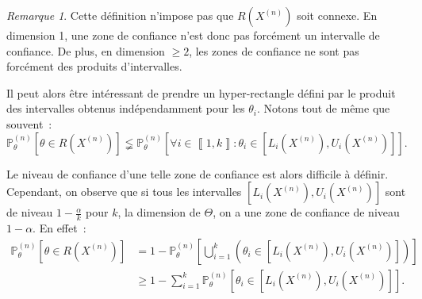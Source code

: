 \documentclass{report}
\renewcommand{\P}{\mathbb P}
\newcommand{\intint}[2]{\left\llbracket#1, #2\right\rrbracket}
\newcommand{\n}{{(n)}}
\newcommand{\Xn}{{X^\n}}
\theoremstyle{definition}
\theoremstyle{remark}
\newtheorem*{rmq}{Remarque}
\begin{document}
		\begin{rmq} Cette définition n'impose pas que $R(\Xn)$ soit connexe. En dimension 1, une zone de confiance n'est donc pas forcément un intervalle de
		confiance. De plus, en dimension $\geq 2$, les zones de confiance ne sont pas forcément des produits d'intervalles.

		Il peut alors être intéressant de prendre un hyper-rectangle défini par le produit des intervalles obtenus indépendamment pour les $\theta_i$.
		Notons tout de même que souvent~:
		\[\P_\theta^\n[\theta \in R(\Xn)] \lneqq \P_\theta^\n\left[\forall i \in \intint 1k : \theta_i \in [L_i(\Xn), U_i(\Xn)]\right].\]

		Le niveau de confiance d'une telle zone de confiance est alors difficile à définir. Cependant, on observe que si tous les intervalles
		$[L_i(\Xn), U_i(\Xn)]$ sont de niveau $1-\frac \alpha k$ pour $k$, la dimension de $\Theta$, on a une zone de confiance de niveau $1-\alpha$. En effet~:
		\begin{align*}
			\P_\theta^\n[\theta \in R(\Xn)] &= 1 - \P_\theta^\n\left[\bigcup_{i=1}^k\left(\theta_i \in \left[L_i(\Xn), U_i(\Xn)\right]\right)\right] \\
			&\geq 1 - \sum_{i=1}^k\P_\theta^\n\left[\theta_i \in \left[L_i(\Xn), U_i(\Xn)\right]\right].
		\end{align*}
		\end{rmq}
\end{document}
